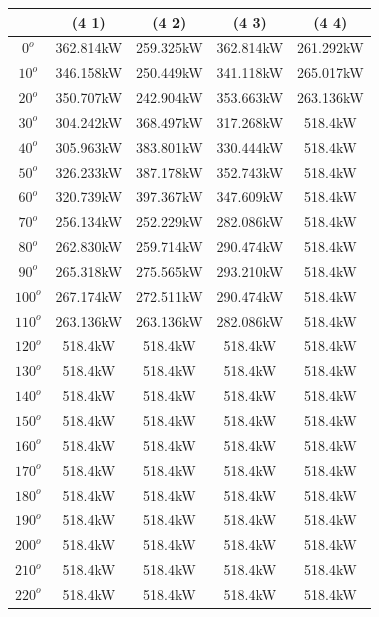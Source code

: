         \begin{table}[H]
        	\centering
        	\begin{tabular}{|c|c|c|c|c|} \hline
        			& (4 1)		& (4 2)		& (4 3)		& (4 4)		\\ \hline
		$0^o$	& 362.814kW	& 259.325kW	& 362.814kW	& 261.292kW	\\ \hline
		$10^o$	& 346.158kW	& 250.449kW	& 341.118kW	& 265.017kW	\\ \hline
		$20^o$	& 350.707kW	& 242.904kW	& 353.663kW	& 263.136kW	\\ \hline
		$30^o$	& 304.242kW	& 368.497kW	& 317.268kW	& 518.4kW	\\ \hline
		$40^o$	& 305.963kW	& 383.801kW	& 330.444kW	& 518.4kW	\\ \hline
		$50^o$	& 326.233kW	& 387.178kW	& 352.743kW	& 518.4kW	\\ \hline
		$60^o$	& 320.739kW	& 397.367kW	& 347.609kW	& 518.4kW	\\ \hline
		$70^o$	& 256.134kW	& 252.229kW	& 282.086kW	& 518.4kW	\\ \hline
		$80^o$	& 262.830kW	& 259.714kW	& 290.474kW	& 518.4kW	\\ \hline
		$90^o$	& 265.318kW	& 275.565kW	& 293.210kW	& 518.4kW	\\ \hline
		$100^o$	& 267.174kW	& 272.511kW	& 290.474kW	& 518.4kW	\\ \hline
		$110^o$	& 263.136kW	& 263.136kW	& 282.086kW	& 518.4kW	\\ \hline
		$120^o$	& 518.4kW	& 518.4kW	& 518.4kW	& 518.4kW	\\ \hline
		$130^o$	& 518.4kW	& 518.4kW	& 518.4kW	& 518.4kW	\\ \hline
		$140^o$	& 518.4kW	& 518.4kW	& 518.4kW	& 518.4kW	\\ \hline
		$150^o$	& 518.4kW	& 518.4kW	& 518.4kW	& 518.4kW	\\ \hline
		$160^o$	& 518.4kW	& 518.4kW	& 518.4kW	& 518.4kW	\\ \hline
		$170^o$	& 518.4kW	& 518.4kW	& 518.4kW	& 518.4kW	\\ \hline
		$180^o$	& 518.4kW	& 518.4kW	& 518.4kW	& 518.4kW	\\ \hline
		$190^o$	& 518.4kW	& 518.4kW	& 518.4kW	& 518.4kW	\\ \hline
		$200^o$	& 518.4kW	& 518.4kW	& 518.4kW	& 518.4kW	\\ \hline
		$210^o$	& 518.4kW	& 518.4kW	& 518.4kW	& 518.4kW	\\ \hline
		$220^o$	& 518.4kW	& 518.4kW	& 518.4kW	& 518.4kW	\\ \hline

\end{tabular}
\end{table}
